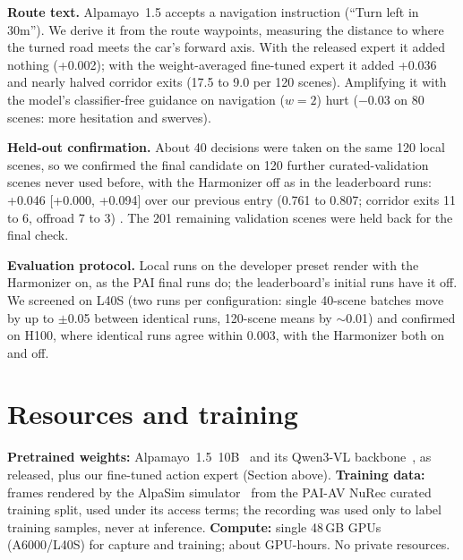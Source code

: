 \textbf{Route text.} Alpamayo~1.5 accepts a navigation instruction (``Turn left in 30m''). We derive it from the
route waypoints, measuring the distance to where the turned road meets the car's forward axis. With the released
expert it added nothing (+0.002); with the weight-averaged fine-tuned expert it added +0.036 and nearly halved
corridor exits (17.5 to 9.0 per 120 scenes). Amplifying it with the model's classifier-free guidance on navigation
($w=2$) hurt ($-$0.03 on 80 scenes: more hesitation and swerves).

\textbf{Held-out confirmation.} About 40 decisions were taken on the same 120 local scenes, so we confirmed the final
candidate on 120 further curated-validation scenes never used before, with the Harmonizer off as in the leaderboard
runs: +0.046 [+0.000, +0.094] over our previous entry (0.761 to 0.807; corridor exits 11 to 6, offroad 7 to 3)
. The 201 remaining validation scenes were held back for the final check.

\textbf{Evaluation protocol.} Local runs on the developer preset render with the Harmonizer on, as the PAI final
runs do; the leaderboard's initial runs have it off. We screened on L40S (two runs per configuration: single
40-scene batches move by up to $\pm$0.05 between identical runs, 120-scene means by $\sim$0.01) and confirmed on
H100, where identical runs agree within 0.003, with the Harmonizer both on and off. 

\section{Resources and training}
\textbf{Pretrained weights:} Alpamayo~1.5~10B~\cite{alpamayo15} and its Qwen3-VL backbone~\cite{qwen3vl}, as
released, plus our fine-tuned action expert (Section above). \textbf{Training data:} frames rendered by the AlpaSim
simulator~\cite{alpasim} from the PAI-AV NuRec curated training split, used under its access terms; the recording
was used only to label training samples, never at inference.  \textbf{Compute:} single 48\,GB GPUs (A6000/L40S) for capture and training;
about  GPU-hours. No private resources.

